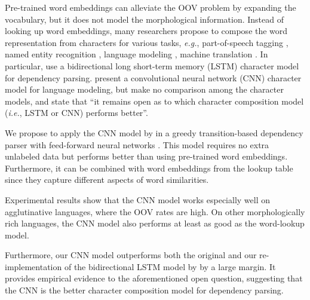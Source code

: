 \documentclass[11pt,a4paper]{article}
\begin{document}
  Pre-trained word embeddings can alleviate the OOV problem by expanding the vocabulary,
  but it does not model the morphological information.
  Instead of looking up word embeddings, many researchers propose to compose the word representation from characters for various tasks, {\em e.g.}, part-of-speech tagging \citep{Santos:2014, Plank:2016}, named entity recognition \citep{Santos:2015}, language modeling \citep{Ling:2015}, machine translation \citep{Costa:2016}.
  In particular, \citet{Ballesteros:2015} use a bidirectional long short-term memory (LSTM) character model for dependency parsing. \citet{Kim:2016} present a convolutional neural network (CNN) character model for language modeling, but make no comparison among the character models, and state that ``it remains open as to which character composition model ({\em i.e.}, LSTM or CNN) performs better''.

  We propose to apply the CNN model by \citet{Kim:2016} in a greedy transition-based dependency parser with feed-forward neural networks \citep{Chen:2014, Weiss:2015}. This model requires no extra unlabeled data but performs better than using pre-trained word embeddings. Furthermore, it can be combined with word embeddings from the lookup table since they capture different aspects of word similarities.

  Experimental results show that the CNN model works especially well on agglutinative languages, where the OOV rates are high. On other morphologically rich languages, the CNN model also performs at least as good as the word-lookup model.

  Furthermore, our CNN model outperforms both the original and our re-implementation of the bidirectional LSTM model by \citet{Ballesteros:2015} by a large margin. It provides empirical evidence to the aforementioned open question, suggesting that the CNN is the better character composition model for dependency parsing.


\end{document}
